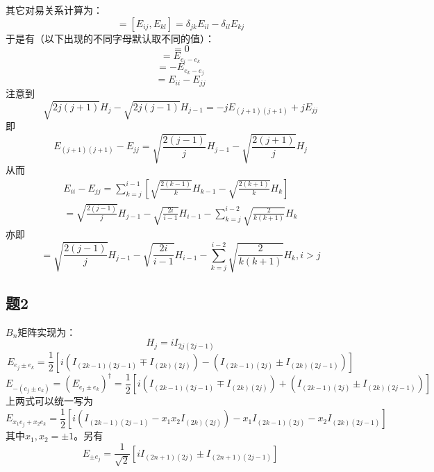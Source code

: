 \documentclass{ctexart}
\begin{document}
	其它对易关系计算为：
	\begin{equation}
	[E_{e_i-e_j},E_{e_k-e_l}]=[E_{ij},E_{kl}]=\delta_{jk}E_{il}-\delta_{il}E_{kj}
	\end{equation}
	于是有（以下出现的不同字母默认取不同的值）：
	\begin{equation}
	[E_{e_i-e_j},E_{e_k-e_l}]=0
	\end{equation}
	\begin{equation}
	[E_{e_i-e_j},E_{e_j-e_k}]=E_{e_i-e_k}
	\end{equation}
	\begin{equation}
	[E_{e_i-e_j},E_{e_k-e_i}]=-E_{e_k-e_j}
	\end{equation}
	\begin{equation}
	[E_{e_i-e_j},E_{e_j-e_i}]=E_{ii}-E_{jj}
	\end{equation}
	注意到
	\begin{equation}
	\sqrt{2j(j+1)}H_j-\sqrt{2j(j-1)}H_{j-1}=-jE_{(j+1)(j+1)}+jE_{jj}
	\end{equation}
	即
	\begin{equation}
	E_{(j+1)(j+1)}-E_{jj}=\sqrt{\frac{2(j-1)}{j}}H_{j-1}-\sqrt{\frac{2(j+1)}{j}}H_j
	\end{equation}
	从而
	\begin{multline}
	E_{ii}-E_{jj}=\sum_{k=j}^{i-1}\left[\sqrt{\frac{2(k-1)}{k}}H_{k-1}-\sqrt{\frac{2(k+1)}{k}}H_k\right]\\=\sqrt{\frac{2(j-1)}{j}}H_{j-1}-\sqrt{\frac{2i}{i-1}}H_{i-1}-\sum_{k=j}^{i-2}\sqrt{\frac{2}{k(k+1)}}H_k
	\end{multline}
	亦即
	\begin{equation}
	[E_{e_i-e_j},E_{e_j-e_i}]=\sqrt{\frac{2(j-1)}{j}}H_{j-1}-\sqrt{\frac{2i}{i-1}}H_{i-1}-\sum_{k=j}^{i-2}\sqrt{\frac{2}{k(k+1)}}H_k,i>j
	\end{equation}
	
	\subsection{题2}
	
	$B_n$矩阵实现为：
	\begin{equation}
	H_j=iI_{2j(2j-1)}
	\end{equation}
	\begin{equation}
	E_{e_j\pm e_k}=\frac{1}{2}\left[i(I_{(2k-1)(2j-1)}\mp I_{(2k)(2j)})-(I_{(2k-1)(2j)}\pm I_{(2k)(2j-1)})\right]
	\end{equation}
	\begin{equation}
	E_{-(e_j\pm e_k)}=\left(E_{e_j\pm e_k}\right)^\dagger=\frac{1}{2}\left[i(I_{(2k-1)(2j-1)}\mp I_{(2k)(2j)})+(I_{(2k-1)(2j)}\pm I_{(2k)(2j-1)})\right]
	\end{equation}
	上两式可以统一写为
	\begin{equation}
	E_{x_1e_j+x_2e_k}=\frac{1}{2}\left[i(I_{(2k-1)(2j-1)}-x_1x_2 I_{(2k)(2j)})-x_1I_{(2k-1)(2j)}-x_2I_{(2k)(2j-1)}\right]
	\end{equation}
	其中$x_1,x_2=\pm 1$。另有
	\begin{equation}
	E_{\pm e_j}=\frac{1}{\sqrt 2}\left[iI_{(2n+1)(2j)}\pm I_{(2n+1)(2j-1)}\right]
	\end{equation}
	
\end{document}
